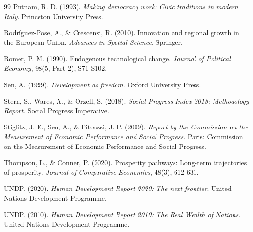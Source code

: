 \documentclass[authoryear,12pt]{elsarticle}
\begin{document}
\begin{thebibliography}{99}
Putnam, R. D. (1993).
\textit{Making democracy work: Civic traditions in modern Italy}.
Princeton University Press.

Rodríguez-Pose, A., \& Crescenzi, R. (2010).
Innovation and regional growth in the European Union.
\textit{Advances in Spatial Science}, Springer.

Romer, P. M. (1990).
Endogenous technological change.
\textit{Journal of Political Economy}, 98(5, Part 2), S71-S102.

Sen, A. (1999).
\textit{Development as freedom}.
Oxford University Press.

Stern, S., Wares, A., \& Orzell, S. (2018).
\textit{Social Progress Index 2018: Methodology Report}.
Social Progress Imperative.

Stiglitz, J. E., Sen, A., \& Fitoussi, J. P. (2009).
\textit{Report by the Commission on the Measurement of Economic Performance and Social Progress}.
Paris: Commission on the Measurement of Economic Performance and Social Progress.

Thompson, L., \& Conner, P. (2020).
Prosperity pathways: Long-term trajectories of prosperity.
\textit{Journal of Comparative Economics}, 48(3), 612-631.

UNDP. (2020).
\textit{Human Development Report 2020: The next frontier}.
United Nations Development Programme.

UNDP. (2010).
\textit{Human Development Report 2010: The Real Wealth of Nations}.
United Nations Development Programme.

\end{thebibliography}
\end{document}
